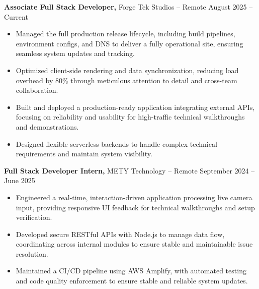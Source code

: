 \documentclass[11pt]{article}       %
\begin{document}
\textbf{Associate Full Stack Developer,} {Forge Tek Studios} -- Remote \hfill August 2025 -- Current 
\vspace{-9pt}
\begin{itemize}
  \item Managed the full production release lifecycle, including build pipelines, environment configs, and DNS to deliver a fully operational site, ensuring seamless system updates and tracking.
  \item Optimized client-side rendering and data synchronization, reducing load overhead by 80\% through meticulous attention to detail and cross-team collaboration.
  \item Built and deployed a production-ready application integrating external APIs, focusing on reliability and usability for high-traffic technical walkthroughs and demonstrations.
  \item Designed flexible serverless backends to handle complex technical requirements and maintain system visibility.
\end{itemize}

\textbf{Full Stack Developer Intern,} {METY Technology} -- Remote \hfill September 2024 -- June 2025 
\vspace{-9pt}
\begin{itemize}
  \item Engineered a real-time, interaction-driven application processing live camera input, providing responsive UI feedback for technical walkthroughs and setup verification.
  \item Developed secure RESTful APIs with Node.js to manage data flow, coordinating across internal modules to ensure stable and maintainable issue resolution.
  \item Maintained a CI/CD pipeline using AWS Amplify, with automated testing and code quality enforcement to ensure stable and reliable system updates.
\end{itemize}

\end{document}
